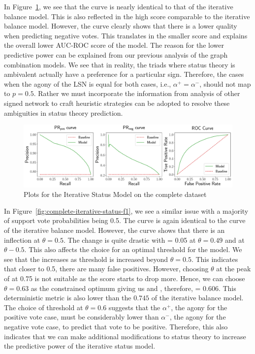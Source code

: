 In Figure~\ref{fig:complete-iterative-status}, we see that the \posPR curve is nearly identical to that of the iterative balance model.
This is also reflected in the high \aucposPR score comparable to the iterative balance model.
However, the \negPR curve clearly shows that there is a lower quality when predicting negative votes.
This translates in the smaller \aucnegPR score and explains the overall lower AUC-ROC score of the model.
The reason for the lower predictive power can be explained from our previous analysis of the graph combination models.
We see that in reality, the triads where status theory is ambivalent actually have a preference for a particular sign.
Therefore, the cases when the agony of the LSN is equal for both cases, i.e., $\alpha^{+}=\alpha^{-}$, should not map to $p=0.5$.
Rather we must incorporate the information from analysis of other signed network to craft  heuristic strategies can be adopted to resolve these ambiguities in status theory prediction.

\begin{figure}[htp]
    \centering
    \includegraphics[width=\textwidth]{images/iterative_Status.pdf}
    \caption{Plots for the Iterative Status Model on the complete \wikirfa dataset}
    \label{fig:complete-iterative-status}
\end{figure}

In Figure~\ref{fig:complete-iterative-status-f1}, we see a similar issue with a majority of support vote probabilities being 0.5.
The \posF curve is again identical to the \posF curve of the iterative balance model.
However, the \negF curve shows that there is an inflection at $\theta=0.5$.
The change is quite drastic with \negF = 0.05 at $\theta=0.49$ and  at $\theta-0.5$. 
This also affects the choice for an optimal threshold for the model.
We see that the \negF increases as threshold is increased beyond $\theta=0.5$.
This indicates that closer to 0.5, there are many false positives.
However, choosing $\theta$ at the peak of \negF at 0.75 is not suitable as the \posF score starts to drop more. 
Hence, we can choose $\theta=0.63$ as the constrained optimum giving us  and , therefore, \macroF = 0.606. 
This deterministic metric is also lower than the $0.745$ of the iterative balance model.
The choice of threshold at $\theta=0.6$ suggests that the $\alpha^{+}$, the agony for the positive vote case, must be considerably lower than $\alpha^{-}$, the agony for the negative vote case, to predict that vote to be positive.
Therefore, this also indicates that we can make additional modifications to status theory to increase the predictive power of the iterative status model.


